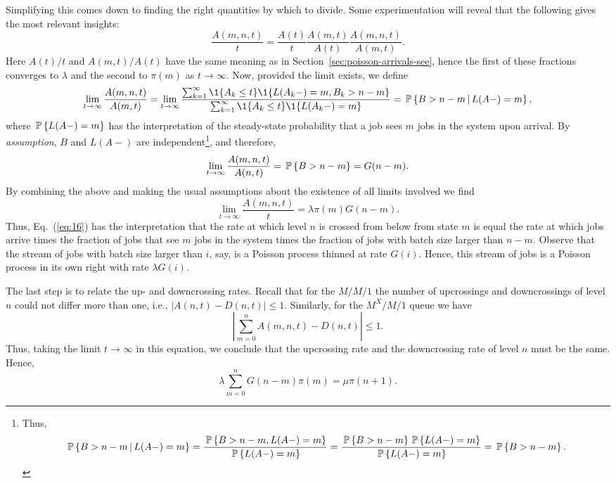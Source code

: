 Simplifying this comes down to finding the right quantities by which
to divide. Some experimentation will reveal that the following gives
the most relevant insights:
\begin{equation}\label{eq:16}
  \frac{A(m,n,t)}t =   \frac{A(t)}t \frac{A(m,t)}{A(t)}\frac{A(m,n,t)}{A(m,t)}.
\end{equation}
Here $A(t)/t$ and $A(m,t)/A(t)$ have the same meaning as in
Section~\ref{sec:poisson-arrivals-see}, hence the first of these
fractions converges to $\lambda$ and the second to $\pi(m)$ as
$t\to\infty$. Now, provided the limit exists, we define
\begin{equation*}
\lim_{t\to\infty} \frac{A(m,n,t)}{A(m,t)} = 
\lim_{t\to\infty} \frac{\sum_{k=1}^\infty \1{A_k \leq t}\1{L(A_k-) = m, B_k > n-m}}
{\sum_{k=1}^\infty \1{A_k \leq t}\1{L(A_k-) = m}}=\P{B>n-m\given L(A-)=m},
\end{equation*}
where $\P{L(A-)=m}$ has the interpretation of the steady-state
probability that a job sees $m$ jobs in the system upon arrival.  By
\emph{assumption}, $B$ and $L(A-)$ are independent\footnote{Thus, 
\begin{equation*}
\P{B>n-m\given L(A-)=m} =
\frac{\P{B>n-m,L(A-)=m}}{\P{L(A-)=m}}=
\frac{\P{B>n-m}\P{L(A-)=m}}{\P{L(A-)=m}} = \P{B>n-m}.
\end{equation*}
}, and therefore,
\begin{equation*}
\lim_{t\to\infty} \frac{A(m,n,t)}{A(n,t)} = \P{B>n-m} = G(n-m).
\end{equation*} 
By combining the above and making the usual assumptions about the
existence of all limits involved we find
\begin{equation*}
\lim_{t\to\infty}   \frac{A(m,n,t)}t = \lambda \pi(m) G(n-m).
\end{equation*}
Thus, Eq.~(\ref{eq:16}) has the interpretation that the rate at which
level $n$ is crossed from below from state $m$ is equal the rate at
which jobs arrive times the fraction of jobs that see $m$ jobs in the
system times the fraction of jobs with batch size larger than $n-m$.
Observe that the stream of jobs with batch size larger than $i$, say,
is a Poisson process thinned at rate $G(i)$. Hence, this stream of
jobs is a Poisson process in its own right with rate $\lambda G(i)$.


The last step is to relate the up- and downcrossing rates.  Recall
that for the $M/M/1$ the number of upcrossings and downcrossings of
level $n$ could not differ more than one, i.e.,
$|A(n,t)-D(n,t)|\leq 1$. Similarly, for the $M^X/M/1$ queue we have
 \begin{equation}\label{eq:53}
 \left|  \sum_{m=0}^n A(m,n,t) - D(n,t) \right|\leq1.
\end{equation}
Thus, taking the limit $t\to\infty$ in this equation, we conclude that
the upcrossing rate and the downcrossing rate of level $n$ must be the
same. Hence,
\begin{equation}\label{eq:42}
\lambda  \sum_{m=0}^n G(n-m) \pi(m) = \mu \pi(n+1).
\end{equation}


